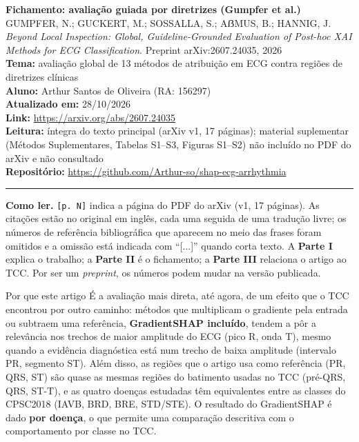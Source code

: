 \documentclass[11pt,a4paper]{article}
\begin{document}
\begin{center}
    {\LARGE \textbf{Fichamento: avaliação guiada por diretrizes (Gumpfer et al.)}} \\[0.35em]
    {\large GUMPFER, N.; GUCKERT, M.; SOSSALLA, S.; AẞMUS, B.; HANNIG, J. \textit{Beyond Local Inspection: Global, Guideline-Grounded Evaluation of Post-hoc XAI Methods for ECG Classification}. Preprint arXiv:2607.24035, 2026} \\[0.3em]
    \textbf{Tema:} avaliação global de 13 métodos de atribuição em ECG contra regiões de diretrizes clínicas \\[0.2em]
    \textbf{Aluno:} Arthur Santos de Oliveira (RA: 156297) \\[0.2em]
    \textbf{Atualizado em:} 28/10/2026 \\[0.2em]
    \textbf{Link:} \url{https://arxiv.org/abs/2607.24035} \\[0.2em]
    \textbf{Leitura:} íntegra do texto principal (arXiv v1, 17 páginas); material suplementar (Métodos Suplementares, Tabelas S1--S3, Figuras S1--S2) não incluído no PDF do arXiv e não consultado \\[0.2em]
    \textbf{Repositório:} \url{https://github.com/Arthur-so/shap-ecg-arrhythmia}
\end{center}
\vspace{-0.5em}
\hrule
\vspace{0.8em}

\textbf{Como ler.} \texttt{[p. N]} indica a página do PDF do arXiv (v1, 17 páginas). As citações estão no original em inglês, cada uma seguida de uma tradução livre; os números de referência bibliográfica que aparecem no meio das frases foram omitidos e a omissão está indicada com “[...]” quando corta texto. A \textbf{Parte I} explica o trabalho; a \textbf{Parte II} é o fichamento; a \textbf{Parte III} relaciona o artigo ao TCC. Por ser um \textit{preprint}, os números podem mudar na versão publicada.

\begin{infobox}[note]{Por que este artigo}
É a avaliação mais direta, até agora, de um efeito que o TCC encontrou por outro caminho: métodos que multiplicam o gradiente pela entrada ou subtraem uma referência, \textbf{GradientSHAP incluído}, tendem a pôr a relevância nos trechos de maior amplitude do ECG (pico R, onda T), mesmo quando a evidência diagnóstica está num trecho de baixa amplitude (intervalo PR, segmento ST). Além disso, as regiões que o artigo usa como referência (PR, QRS, ST) são quase as mesmas regiões do batimento usadas no TCC (pré-QRS, QRS, ST-T), e as quatro doenças estudadas têm equivalentes entre as classes do CPSC2018 (IAVB, BRD, BRE, STD/STE). O resultado do GradientSHAP é dado \textbf{por doença}, o que permite uma comparação descritiva com o comportamento por classe no TCC.
\end{infobox}
\end{document}
